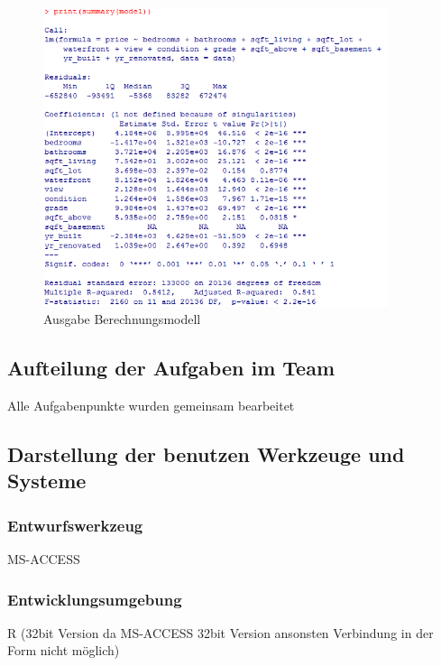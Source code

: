\begin{figure}[!htb]
        \begin{minipage}{1\textwidth}
                \centering
                \includegraphics[width=0.90\textwidth]{pics/tutor8.png}\par\vspace{0cm}
                \caption{Ausgabe Berechnungsmodell}
                \label{fig:tutor8}
        \end{minipage}
\end{figure}





\subsection{Aufteilung der Aufgaben im Team}
Alle Aufgabenpunkte wurden gemeinsam bearbeitet
\subsection{Darstellung der benutzen Werkzeuge und Systeme}
\subsubsection*{Entwurfswerkzeug}
MS-ACCESS
\subsubsection*{Entwicklungsumgebung}
R (32bit Version da MS-ACCESS 32bit Version ansonsten Verbindung in der Form nicht möglich)

